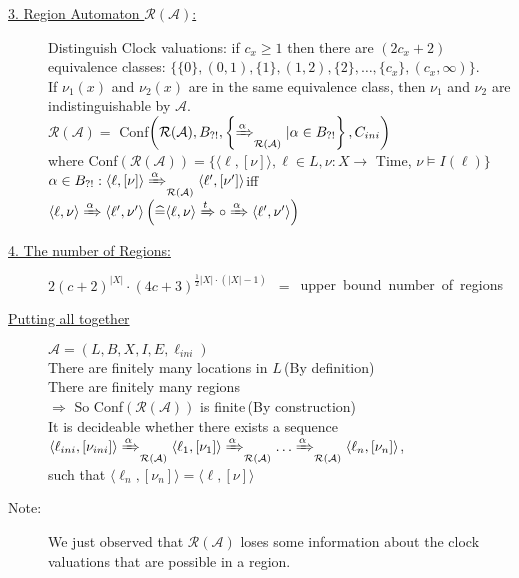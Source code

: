 \begin{tcolorbox}[colback=kapiteleins!5!white, colframe=orange!75!black, title=\textbf{Location Reachability / The Region Automata}, left=0mm, right=0mm, top=0mm, bottom=0mm]
\begin{description}
\item[\uline{3. Region Automaton $\mathcal{R}(\mathcal{A})$:}] \hfill \newline
Distinguish Clock valuations: if $c_x \geq 1$ then there are $(2 c_x + 2)$ equivalence classes: \hfill $\{\{0\}, (0,1), \{1\}, (1,2), \{2\}, \ldots, \{c_x\}, (c_x, \infty)\}.$\\
If $\nu_1(x)$ and $\nu_2(x)$ are in the same equivalence class, then $\nu_1$ and $\nu_2$ are indistinguishable by $\mathcal{A}$.\\
$\mathcal{R}(\mathcal{A}) = $ Conf$\left( \mathcal{R}(\mathcal{A}), B_{?!}, \left\{ \xRightarrow{\alpha}_{\mathcal{R}(\mathcal{A})} \vert \alpha \in B_{?!} \right\}, C_{ini} \right)$\\
where Conf$\left( \mathcal{R}(\mathcal{A}) \right) = \{ \langle \ell, [\nu] \rangle , \ell \in L, \nu : X \rightarrow$ Time, $\nu \models I(\ell)\}$\\
\mbox{$\alpha \in B_{?!}: \langle \ell, [\nu] \rangle \xRightarrow{\alpha}_{\mathcal{R}(\mathcal{A})} \langle \ell', [\nu'] \rangle$\hfill iff $\langle \ell, \nu \rangle \xRightarrow{\alpha} \langle \ell', \nu' \rangle \hfill \left(\widehat{=} \langle \ell, \nu \rangle \xRightarrow{t} \circ \xRightarrow{\alpha} \langle \ell', \nu' \rangle \right)$}

\item[\uline{4. The number of Regions:}] \mbox{$2 \left( c + 2 \right)^{\vert X \vert} \cdot \left( 4c + 3 \right)^{\frac{1}{2} \vert X \vert \cdot \left( \vert X \vert - 1 \right)}$ $=$ upper bound number of regions}
\item[\uline{Putting all together}] $\mathcal{A} = \left( L, B, X, I, E, \ell_{ini} \right)$\\
There are finitely many locations in $L$\,(By definition)\\
There are finitely many regions\\
$\Rightarrow$ So Conf$\left( \mathcal{R}(\mathcal{A}) \right)$ is finite\,(By construction)\\
It is decideable whether there exists a sequence\\
$\langle \ell_{ini}, [\nu_{ini}] \rangle \xRightarrow{\alpha}_{\mathcal{R}(\mathcal{A})} \langle \ell_1, [\nu_1] \rangle \xRightarrow{\alpha}_{\mathcal{R}(\mathcal{A})} \ldots \xRightarrow{\alpha}_{\mathcal{R}(\mathcal{A})} \langle \ell_n, [\nu_n] \rangle$,\\
such that $\langle \ell_n, [\nu_n] \rangle = \langle \ell, [\nu] \rangle$
\item[Note:] We just observed that $\mathcal{R}(\mathcal{A})$ loses some information about the clock valuations that are possible in a region.
\end{description}
\end{tcolorbox}

